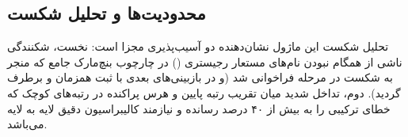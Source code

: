 \subsection{محدودیت‌ها و تحلیل شکست}
تحلیل شکست این ماژول نشان‌دهنده دو آسیب‌پذیری مجزا است: نخست، شکنندگی ناشی از همگام نبودن نام‌های مستعار رجیستری () در چارچوب بنچ‌مارک جامع که منجر به شکست در مرحله فراخوانی شد (و در بازبینی‌های بعدی با ثبت همزمان  و  برطرف گردید). دوم، تداخل شدید میان تقریب رتبه پایین و هرس پراکنده در رتبه‌های کوچک که خطای ترکیبی را به بیش از ۴۰ درصد رسانده و نیازمند کالیبراسیون دقیق لایه به لایه می‌باشد.
